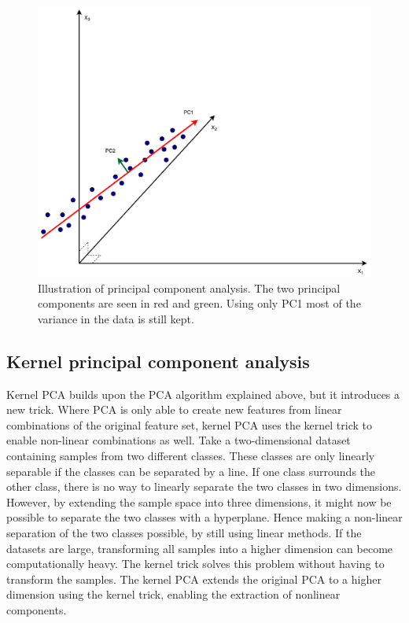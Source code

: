         \begin{figure}
            \centering
            \includegraphics[width=\textwidth]{report/figures/techniques/PCA.pdf}
            \caption{Illustration of principal component analysis. The two principal components are seen in red and green. Using only PC1 most of the variance in the data is still kept.}
            \label{fig:tech:PCA}
        \end{figure}
        
        

    
    \subsection{Kernel principal component analysis}\label{subsec:kernelPCA}
        Kernel PCA builds upon the PCA algorithm explained above, but it introduces a new trick. Where PCA is only able to create new features from linear combinations of the original feature set, kernel PCA uses the kernel trick to enable non-linear combinations as well. Take a two-dimensional dataset containing samples from two different classes.  These classes are only linearly separable if the classes can be separated by a line. If one class surrounds the other class, there is no way to linearly separate the two classes in two dimensions. However, by extending the sample space into three dimensions, it might now be possible to separate the two classes with a hyperplane. Hence making a non-linear separation of the two classes possible, by still using linear methods. If the datasets are large, transforming all samples into a higher dimension can become computationally heavy. The kernel trick solves this problem without having to transform the samples. The kernel PCA extends the original PCA to a higher dimension using the kernel trick, enabling the extraction of nonlinear components.  
    
